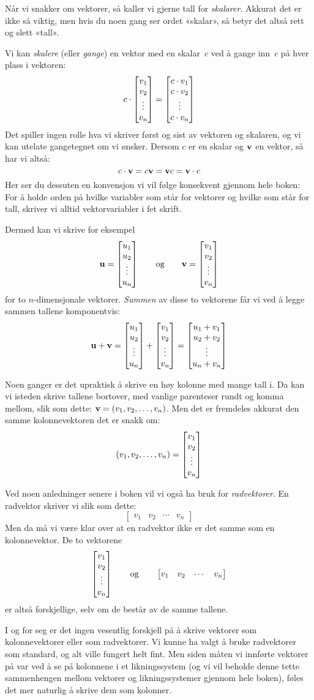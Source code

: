 Når vi snakker om vektorer, så kaller vi gjerne tall for
\emph{skalarer}.  Akkurat det er ikke så viktig, men hvis du noen gang
ser ordet «skalar», så betyr det altså rett og slett «tall».

Vi kan \emph{skalere} (eller \emph{gange}) en vektor med en skalar~$c$
ved å gange inn~$c$ på hver plass i vektoren:
\[
c \cdot \begin{bmatrix} v_1 \\ v_2 \\ \vdots \\ v_n \end{bmatrix} = \begin{bmatrix} c \cdot v_1 \\ c \cdot v_2 \\ \vdots \\ c \cdot v_n \end{bmatrix}
\]
Det spiller ingen rolle hva vi skriver først og sist av vektoren og
skalaren, og vi kan utelate gangetegnet om vi ønsker.  Dersom $c$ er
en skalar og $\mathbf{v}$ en vektor, så har vi altså:
\[
c \cdot \mathbf{v} = c \mathbf{v} = \mathbf{v} c = \mathbf{v} \cdot c
\]
Her ser du dessuten en konvensjon vi vil følge konsekvent gjennom hele
boken: For å holde orden på hvilke variabler som står for vektorer og
hvilke som står for tall, skriver vi alltid vektorvariabler i fet
skrift.

Dermed kan vi skrive for eksempel
\[
\mathbf{u} = \begin{bmatrix} u_1 \\ u_2 \\ \vdots \\ u_n \end{bmatrix}
\qquad\text{og}\qquad
\mathbf{v} = \begin{bmatrix} v_1 \\ v_2 \\ \vdots \\ v_n \end{bmatrix}
\]
for to $n$-dimensjonale vektorer.  \emph{Summen} av disse to vektorene
får vi ved å legge sammen tallene komponentvis:
\[
\mathbf{u} + \mathbf{v}
= \begin{bmatrix} u_1 \\ u_2 \\ \vdots \\ u_n \end{bmatrix} + \begin{bmatrix} v_1 \\ v_2 \\ \vdots \\ v_n \end{bmatrix}
= \begin{bmatrix} u_1 + v_1 \\ u_2 + v_2 \\ \vdots \\ u_n + v_n \end{bmatrix}
\]

Noen ganger er det upraktisk å skrive en høy kolonne med mange tall i.
Da kan vi isteden skrive tallene bortover, med vanlige parenteser
rundt og komma mellom, slik som dette: $\mathbf{v} = (v_1, v_2, \ldots, v_n)$.
Men det er fremdeles akkurat den samme kolonnevektoren det er snakk om:
\[
(v_1, v_2, \ldots, v_n) = \begin{bmatrix} v_1 \\ v_2 \\ \vdots \\ v_n \end{bmatrix}
\]


Ved noen anledninger senere i boken vil vi også ha bruk for
\emph{radvektorer}.  En radvektor skriver vi slik som dette:
\[
\begin{bmatrix}
v_{1} & v_{2} & \cdots & v_{n}
\end{bmatrix}
\]
Men da må vi være klar over at en radvektor ikke er det samme som en
kolonnevektor.  De to vektorene
\[
\begin{bmatrix} v_1 \\ v_2 \\ \vdots \\ v_n \end{bmatrix}
\qquad\text{og}\qquad
\begin{bmatrix}
v_{1} & v_{2} & \cdots & v_{n}
\end{bmatrix}
\]
er altså forskjellige, selv om de består av de samme tallene.

I og for seg er det ingen vesentlig forskjell på å skrive vektorer som
kolonnevektorer eller som radvektorer.  Vi kunne ha valgt å bruke
radvektorer som standard, og alt ville fungert helt fint.  Men siden
måten vi innførte vektorer på var ved å se på kolonnene i et
likningssystem (og vi vil beholde denne tette sammenhengen mellom
vektorer og likningssystemer gjennom hele boken), føles det mer
naturlig å skrive dem som kolonner.


